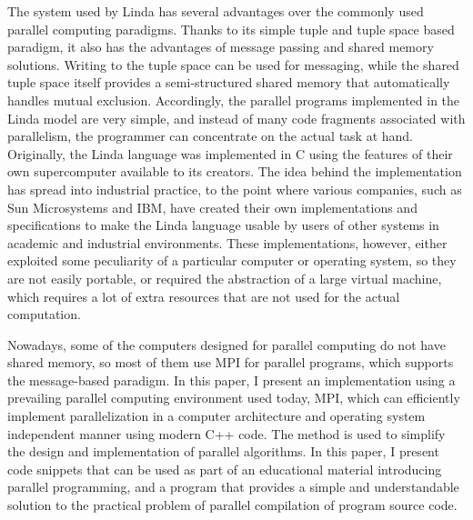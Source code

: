 The system used by Linda has several advantages over the commonly used parallel computing paradigms. Thanks to its simple tuple and tuple space based paradigm, it also has the advantages of message passing and shared memory solutions. Writing to the tuple space can be used for messaging, while the shared tuple space itself provides a semi-structured shared memory that automatically handles mutual exclusion. Accordingly, the parallel programs implemented in the Linda model are very simple, and instead of many code fragments associated with parallelism, the programmer can concentrate on the actual task at hand. Originally, the Linda language was implemented in C using the features of their own supercomputer available to its creators. The idea behind the implementation has spread into industrial practice, to the point where various companies, such as Sun Microsystems and IBM, have created their own implementations and specifications to make the Linda language usable by users of other systems in academic and industrial environments. These implementations, however, either exploited some peculiarity of a particular computer or operating system, so they are not easily portable, or required the abstraction of a large virtual machine, which requires a lot of extra resources that are not used for the actual computation.

Nowadays, some of the computers designed for parallel computing do not have shared memory, so most of them use MPI for parallel programs, which supports the message-based paradigm. In this paper, I present an implementation using a prevailing parallel computing environment used today, MPI, which can efficiently implement parallelization in a computer architecture and operating system independent manner using modern C++ code. The method is used to simplify the design and implementation of parallel algorithms. In this paper, I present code snippets that can be used as part of an educational material introducing parallel programming, and a program that provides a simple and understandable solution to the practical problem of parallel compilation of program source code.

\vfill
\selectthesislanguage

\setcounter{romanPage}{\value{page}}
